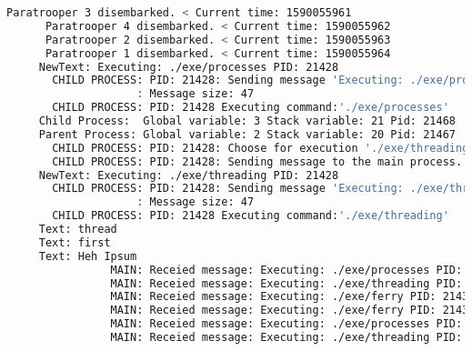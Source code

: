 \documentclass{article}
\begin{document}
\begin{lstlisting}[language=BASH]
      Paratrooper 3 disembarked. < Current time: 1590055961
      Paratrooper 4 disembarked. < Current time: 1590055962
      Paratrooper 2 disembarked. < Current time: 1590055963
      Paratrooper 1 disembarked. < Current time: 1590055964
     NewText: Executing: ./exe/processes PID: 21428
       CHILD PROCESS: PID: 21428: Sending message 'Executing: ./exe/processes PID: 21428' to the MAIN process...
                    : Message size: 47
       CHILD PROCESS: PID: 21428 Executing command:'./exe/processes'
     Child Process:  Global variable: 3 Stack variable: 21 Pid: 21468
     Parent Process: Global variable: 2 Stack variable: 20 Pid: 21467
       CHILD PROCESS: PID: 21428: Choose for execution './exe/threading'
       CHILD PROCESS: PID: 21428: Sending message to the main process...
     NewText: Executing: ./exe/threading PID: 21428
       CHILD PROCESS: PID: 21428: Sending message 'Executing: ./exe/threading PID: 21428' to the MAIN process...
                    : Message size: 47
       CHILD PROCESS: PID: 21428 Executing command:'./exe/threading'
     Text: thread
     Text: first
     Text: Heh Ipsum
                MAIN: Receied message: Executing: ./exe/processes PID: 21428
                MAIN: Receied message: Executing: ./exe/threading PID: 21432
                MAIN: Receied message: Executing: ./exe/ferry PID: 21432
                MAIN: Receied message: Executing: ./exe/ferry PID: 21432
                MAIN: Receied message: Executing: ./exe/processes PID: 21428
                MAIN: Receied message: Executing: ./exe/threading PID: 21428
     
\end{lstlisting}
\end{document}
